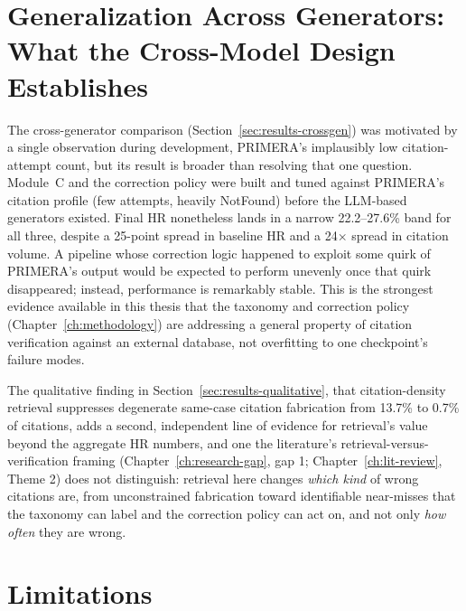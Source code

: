 \section{Generalization Across Generators: What the Cross-Model Design Establishes}
\label{sec:disc-generalization}

The cross-generator comparison (Section~\ref{sec:results-crossgen}) was motivated by a single observation during development, PRIMERA's implausibly low citation-attempt count, but its result is broader than resolving that one question. Module~C and the correction policy were built and tuned against PRIMERA's citation profile (few attempts, heavily NotFound) before the LLM-based generators existed. Final HR nonetheless lands in a narrow 22.2--27.6\% band for all three, despite a 25-point spread in baseline HR and a 24$\times$ spread in citation volume. A pipeline whose correction logic happened to exploit some quirk of PRIMERA's output would be expected to perform unevenly once that quirk disappeared; instead, performance is remarkably stable. This is the strongest evidence available in this thesis that the taxonomy and correction policy (Chapter~\ref{ch:methodology}) are addressing a general property of citation verification against an external database, not overfitting to one checkpoint's failure modes.

The qualitative finding in Section~\ref{sec:results-qualitative}, that citation-density retrieval suppresses degenerate same-case citation fabrication from 13.7\% to 0.7\% of citations, adds a second, independent line of evidence for retrieval's value beyond the aggregate HR numbers, and one the literature's retrieval-versus-verification framing (Chapter~\ref{ch:research-gap}, gap 1; Chapter~\ref{ch:lit-review}, Theme 2) does not distinguish: retrieval here changes \emph{which kind} of wrong citations are, from unconstrained fabrication toward identifiable near-misses that the taxonomy can label and the correction policy can act on, and not only \emph{how often} they are wrong.

\section{Limitations}
\label{sec:disc-limitations}

